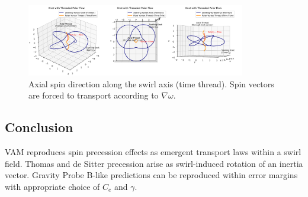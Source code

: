 \begin{figure}[h!]
\centering
\includegraphics[width=0.85\textwidth]{images/KnotThreadedPolarFlow}
\caption{Axial spin direction along the swirl axis (time thread). Spin vectors are forced to transport according to \( \nabla \omega \).}
\label{fig:threadedflow}
\end{figure}

\subsection*{Conclusion}
VAM reproduces spin precession effects as emergent transport laws within a swirl field. Thomas and de Sitter precession arise as swirl-induced rotation of an inertia vector. Gravity Probe B-like predictions can be reproduced within error margins with appropriate choice of \( C_e \) and \( \gamma \).